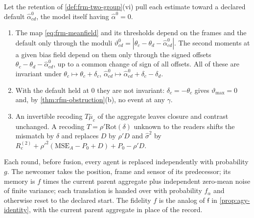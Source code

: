 \begin{proposition}\label{prop:rfm-representation}
Let the retention of \cref{def:frm-two-group}(vi) pull each estimate toward a declared default $\hat\alpha^0_{cd}$, the model itself having $\hat\alpha^0=0$.
\begin{enumerate}
\item[(a)] The map \eqref{eq:frm-meanfield} and its thresholds depend on the frames and the default only through the moduli $\vartheta^0_{cd}=|\theta_c-\theta_d-\hat\alpha^0_{cd}|$. The second moments at a given bias field depend on them only through the signed offsets $\theta_c-\theta_d-\hat\alpha^0_{cd}$, up to a common change of sign of all offsets. All of these are invariant under $\theta_c\mapsto\theta_c+\delta_c$, $\hat\alpha^0_{cd}\mapsto\hat\alpha^0_{cd}+\delta_c-\delta_d$.
\item[(b)] With the default held at $0$ they are not invariant: $\delta_c=-\theta_c$ gives $\vartheta_{\max}=0$ and, by \cref{thm:rfm-obstruction}(b), no event at any $\gamma$.
\item[(c)] An invertible recoding $T\bar\mu_c$ of the aggregate leaves closure and contrast unchanged. A recoding $T=\rho'\mathrm{Rot}(\delta)$ unknown to the readers shifts the mismatch by $\delta$ and replaces $D$ by $\rho'D$ and $\hat\sigma^2$ by $R_c^{(2)}+\rho'^2(\mathrm{MSE}_A-P_0+D)+P_0-\rho'D$.
\end{enumerate}
\end{proposition}

\begin{definition}[Turnover]\label{def:rfm-turnover}
Each round, before fusion, every agent is replaced independently with probability $g$. The newcomer takes the position, frame and sensor of its predecessor; its memory is $f$ times the current parent aggregate plus independent zero-mean noise of finite variance; each translation is handed over with probability $f_\alpha$ and otherwise reset to the declared start. The fidelity $f$ is the analog of $\mathsf f$ in \cref{prop:agy-identity}, with the current parent aggregate in place of the record.
\end{definition}

